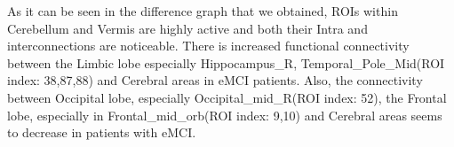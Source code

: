 \documentclass[journal]{IEEEtran}
\begin{document}
	As it can be seen in the difference graph that we obtained, ROIs within Cerebellum and Vermis are highly active and both their Intra and interconnections are noticeable. There is increased functional connectivity between the Limbic lobe especially 
	Hippocampus\_R, Temporal\_Pole\_Mid(ROI index: 38,87,88)
	and Cerebral areas in eMCI patients. Also, the connectivity between Occipital lobe, especially Occipital\_mid\_R(ROI index: 52), the Frontal lobe, especially in Frontal\_mid\_orb(ROI index: 9,10) and Cerebral areas seems to decrease in patients with eMCI. 
	
	
	
	
\end{document}
